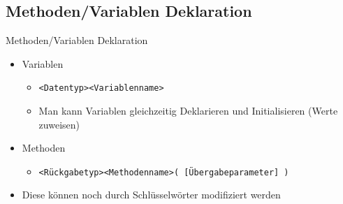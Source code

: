 \subsection{Methoden/Variablen Deklaration}
\begin{frame}{Methoden/Variablen Deklaration}
	\begin{itemize}
		\item Variablen
		
		\begin{itemize}
			\item \alert{\texttt{<Datentyp><Variablenname>}}
			\item Man kann Variablen gleichzeitig Deklarieren und Initialisieren (Werte zuweisen)
		\end{itemize}
		\item Methoden		
		
		\begin{itemize}			
			\item \alert{\texttt{<Rückgabetyp><Methodenname>( [Übergabeparameter] )}}
		\end{itemize}
		\item Diese können noch durch Schlüsselwörter modifiziert werden
	\end{itemize}
\end{frame}



